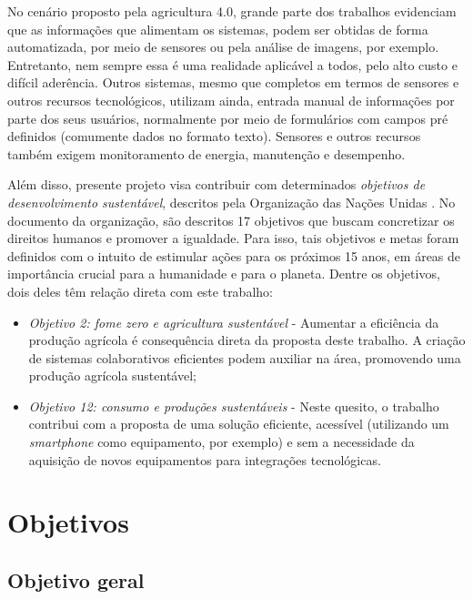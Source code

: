 \documentclass[12pt]{article}
\begin{document}
No cenário proposto pela agricultura 4.0, grande parte dos trabalhos evidenciam que as informações que alimentam os sistemas, podem ser obtidas de forma automatizada, por meio de sensores ou pela análise de imagens, por exemplo. Entretanto, nem sempre essa é uma realidade aplicável a todos, pelo alto custo e difícil aderência. Outros sistemas, mesmo que completos em termos de sensores e outros recursos tecnológicos, utilizam ainda, entrada manual de informações por parte dos seus usuários, normalmente por meio de formulários com campos pré definidos (comumente dados no formato texto). Sensores e outros recursos também exigem monitoramento de energia, manutenção e desempenho.

Além disso, presente projeto visa contribuir com determinados \textit{objetivos de desenvolvimento sustentável}, descritos pela Organização das Nações Unidas \cite{ONU:2020}. No documento da organização, são descritos 17 objetivos que buscam concretizar os direitos humanos e promover a igualdade. Para isso, tais objetivos e metas foram definidos com o intuito de estimular ações para os próximos 15 anos, em áreas de importância crucial para a humanidade e para o planeta. Dentre os objetivos, dois deles têm relação direta com este trabalho:

\begin{itemize}
	\item \textit{Objetivo 2: fome zero e agricultura sustentável} - Aumentar a eficiência da produção agrícola é consequência direta da proposta deste trabalho. A criação de sistemas colaborativos eficientes podem auxiliar na área, promovendo uma produção agrícola sustentável;
	\item \textit{Objetivo 12: consumo e produções sustentáveis} - Neste quesito, o trabalho contribui com a proposta de uma solução eficiente, acessível (utilizando um \textit{smartphone} como equipamento, por exemplo) e sem a necessidade da aquisição de novos equipamentos para integrações tecnológicas.
\end{itemize}

\section{Objetivos}
\label{sec:objetivos}

\subsection{Objetivo geral}
\label{subsec:objetivo_geral}
\end{document}
